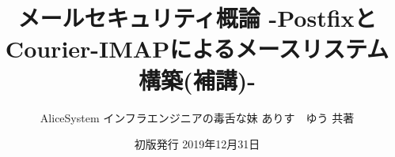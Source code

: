 \title{メールセキュリティ概論 -PostfixとCourier-IMAPによるメースリステム構築(補講)-}
\author{AliceSystem インフラエンジニアの毒舌な妹 ありす　ゆう 共著}
\date{初版発行 2019年12月31日}